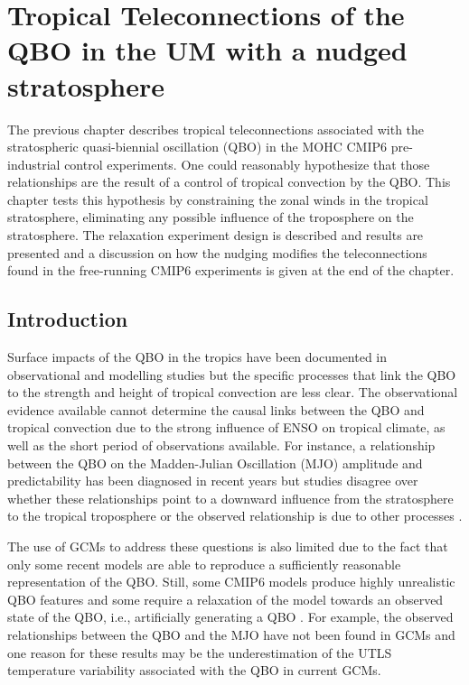 \chapter{\label{ch:7-nudging} Tropical Teleconnections of the QBO in the UM with a nudged stratosphere }

The previous chapter describes tropical teleconnections associated with the stratospheric quasi-biennial oscillation (QBO) in the MOHC CMIP6 pre-industrial control experiments. One could reasonably hypothesize that those relationships are the result of a control of tropical convection by the QBO. 
This chapter tests this hypothesis by constraining the zonal winds in the tropical stratosphere, eliminating any possible influence of the troposphere on the stratosphere. 
The relaxation experiment design is described and results are presented and a discussion on how the nudging modifies the teleconnections found in the free-running CMIP6 experiments is given at the end of the chapter. 

\section{Introduction}

Surface impacts of the QBO in the tropics have been documented in observational and modelling studies \citep{giorgetta1999,collimore2003,garfinkel2010,liess2012,hansen2016tropospheric,gray2018,ma2021} but the specific processes that link the QBO to the strength and height of tropical convection are less clear. 
The observational evidence available \citep[e.g.][]{collimore2003,liess2012,gray2018} cannot determine the causal links between the QBO and tropical convection due to the strong influence of ENSO on tropical climate, as well as the short period of observations available.
For instance,  a relationship between the QBO on the Madden-Julian Oscillation (MJO) amplitude and predictability has been diagnosed in recent years \citep{son2017,wang2019,lim2019,klotzbach2019,densmore2019} but studies disagree over whether these relationships point to a downward influence from the stratosphere to the tropical troposphere \citep{klotzbach2019,lim2019} or the observed relationship is due to other processes \citep{wang2019}.

  The use of GCMs to address these questions is also limited due to the fact that only some recent models are able to reproduce a sufficiently reasonable representation of the QBO. Still, some CMIP6 models produce highly unrealistic QBO features and some require a relaxation of the model towards an observed state of the QBO, i.e., artificially generating a QBO \citep{richter2020}. 
  For example, the observed relationships between the QBO and the MJO have not been found in GCMs \citep{lee2018,kim2020} and one reason for these results may be the underestimation of the UTLS temperature variability associated with the QBO in current GCMs.
  
